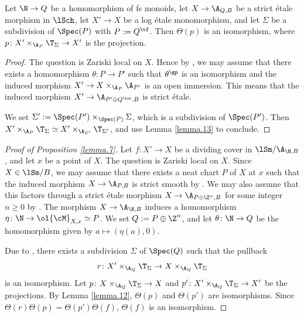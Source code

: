 \documentclass[10pt]{amsart}
\begin{document}
\begin{lem}
\label{lemma.12}
Let $\N\to Q$ be a homomorphism of fs monoids, let $X\to \A_{Q,B}$ be a strict \'etale morphism in $\lSch$, let $X'\to X$ be a log \'etale monomorphism, and let $\Sigma$ be a subdivision of $\Spec(P)$ with $P:=Q^\tf$.
Then $\Theta(p)$ is an isomorphism, where $p\colon X'\times_{\A_{P}}\T_{\Sigma}\to X'$ is the projection.
\end{lem}
\begin{proof}
The question is Zariski local on $X$.
Hence by \cite[Lemma A.11.3]{logDM}, we may assume that there exists a homomorphism $\theta\colon P\to P'$ such that $\theta^\gp$ is an isomorphism and the induced morphism $X'\to X\times_{\A_P}\A_{P'}$ is an open immersion.
This means that the induced morphism $X'\to \A_{P'\oplus Q^{\tor},B}$ is strict \'etale.

We set $\Sigma':=\Spec(P')\times_{\Spec(P)}\Sigma$, which is a subdivision of $\Spec(P')$.
Then $X'\times_{\A_{P}}\T_{\Sigma}\simeq X'\times_{\A_{P'}}\T_{\Sigma'}$, and use Lemma \ref{lemma.13} to conclude.
\end{proof}




\begin{proof}[Proof of Proposition \ref{lemma.7}]
Let $f\colon X'\to X$ be a dividing cover in $\lSm/\A_{\N,B}$, and let $x$ be a point of $X$.
The question is Zariski local on $X$.
Since $X\in \lSm/B$, we may assume that there exists a neat chart $P$ of $X$ at $x$ such that the induced morphism $X\to \A_{P,B}$ is strict smooth by \cite[Lemma A.5.9]{logDM}.
We may also assume that this factors through a strict \'etale morphism $X\to \A_{P\oplus \Z^n,B}$ for some integer $n\geq 0$ by \cite[Corollaire IV.17.11.4]{SGA4}.
The morphism $X\to \A_{\N,B}$ induces a homomorphism $\eta\colon \N \to \ol{\cM}_{X,x}\simeq P$.
We set $Q:=P\oplus \Z^n$, and let $\theta\colon \N\to Q$ be the homomorphism given by $a\mapsto (\eta(a),0)$.

Due to \cite[Proposition A.11.5]{logDM}, there exists a subdivision $\Sigma$ of $\Spec(Q)$ such that the pullback
\[
r\colon X'\times_{\A_Q}\T_{\Sigma}\to X\times_{\A_Q}\T_{\Sigma}
\]
is an isomorphism.
Let $p\colon X\times_{\A_Q}\T_\Sigma\to X$ and $p'\colon X'\times_{\A_Q}\T_\Sigma\to X'$ be the projections.
By Lemma \ref{lemma.12}, $\Theta(p)$ and $\Theta(p')$ are isomorphisms.
Since $\Theta(r)\Theta(p)=\Theta(p')\Theta(f)$, $\Theta(f)$ is an isomorphism.
\end{proof}
\end{document}
